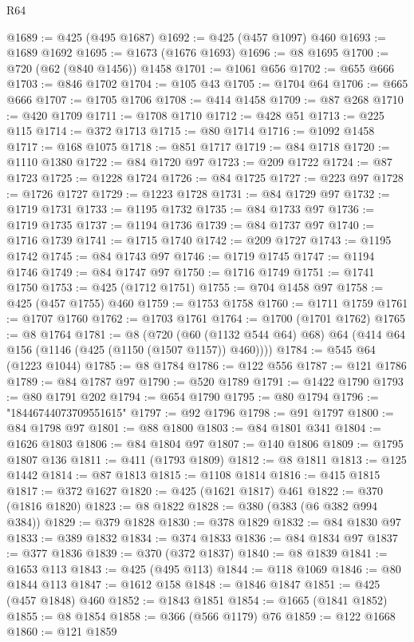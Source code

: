 \begin{lexlean}{R64}
\begin{coremodule}
@1689 := @425 (@495 @1687)
@1692 := @425 (@457 @1097) @460
@1693 := @1689 @1692
@1695 := @1673 (@1676 @1693)
@1696 := @8 @1695
@1700 := @720 (@62 (@840 @1456)) @1458
@1701 := @1061 @656
@1702 := @655 @666
@1703 := @846 @1702
@1704 := @105 @43
@1705 := @1704 @64
@1706 := @665 @666
@1707 := @1705 @1706
@1708 := @414 @1458
@1709 := @87 @268
@1710 := @420 @1709
@1711 := @1708 @1710
@1712 := @428 @51
@1713 := @225 @115
@1714 := @372 @1713
@1715 := @80 @1714
@1716 := @1092 @1458
@1717 := @168 @1075
@1718 := @851 @1717
@1719 := @84 @1718
@1720 := @1110 @1380
@1722 := @84 @1720 @97
@1723 := @209 @1722
@1724 := @87 @1723
@1725 := @1228 @1724
@1726 := @84 @1725
@1727 := @223 @97
@1728 := @1726 @1727
@1729 := @1223 @1728
@1731 := @84 @1729 @97
@1732 := @1719 @1731
@1733 := @1195 @1732
@1735 := @84 @1733 @97
@1736 := @1719 @1735
@1737 := @1194 @1736
@1739 := @84 @1737 @97
@1740 := @1716 @1739
@1741 := @1715 @1740
@1742 := @209 @1727
@1743 := @1195 @1742
@1745 := @84 @1743 @97
@1746 := @1719 @1745
@1747 := @1194 @1746
@1749 := @84 @1747 @97
@1750 := @1716 @1749
@1751 := @1741 @1750
@1753 := @425 (@1712 @1751)
@1755 := @704 @1458 @97
@1758 := @425 (@457 @1755) @460
@1759 := @1753 @1758
@1760 := @1711 @1759
@1761 := @1707 @1760
@1762 := @1703 @1761
@1764 := @1700 (@1701 @1762)
@1765 := @8 @1764
@1781 := @8
    (@720 (@60 (@1132 @544 @64) @68) @64 (@414 @64 @156 (@1146 (@425 (@1150 (@1507 @1157)) @460))))
@1784 := @545 @64 (@1223 @1044)
@1785 := @8 @1784
@1786 := @122 @556
@1787 := @121 @1786
@1789 := @84 @1787 @97
@1790 := @520 @1789
@1791 := @1422 @1790
@1793 := @80 @1791 @202
@1794 := @654 @1790
@1795 := @80 @1794
@1796 := "18446744073709551615"
@1797 := @92 @1796
@1798 := @91 @1797
@1800 := @84 @1798 @97
@1801 := @88 @1800
@1803 := @84 @1801 @341
@1804 := @1626 @1803
@1806 := @84 @1804 @97
@1807 := @140 @1806
@1809 := @1795 @1807 @136
@1811 := @411 (@1793 @1809)
@1812 := @8 @1811
@1813 := @125 @1442
@1814 := @87 @1813
@1815 := @1108 @1814
@1816 := @415 @1815
@1817 := @372 @1627
@1820 := @425 (@1621 @1817) @461
@1822 := @370 (@1816 @1820)
@1823 := @8 @1822
@1828 := @380 (@383 (@6 @382 @994 @384))
@1829 := @379 @1828
@1830 := @378 @1829
@1832 := @84 @1830 @97
@1833 := @389 @1832
@1834 := @374 @1833
@1836 := @84 @1834 @97
@1837 := @377 @1836
@1839 := @370 (@372 @1837)
@1840 := @8 @1839
@1841 := @1653 @113
@1843 := @425 (@495 @113)
@1844 := @118 @1069
@1846 := @80 @1844 @113
@1847 := @1612 @158
@1848 := @1846 @1847
@1851 := @425 (@457 @1848) @460
@1852 := @1843 @1851
@1854 := @1665 (@1841 @1852)
@1855 := @8 @1854
@1858 := @366 (@566 @1179) @76
@1859 := @122 @1668
@1860 := @121 @1859

\end{coremodule}
\end{lexlean}
